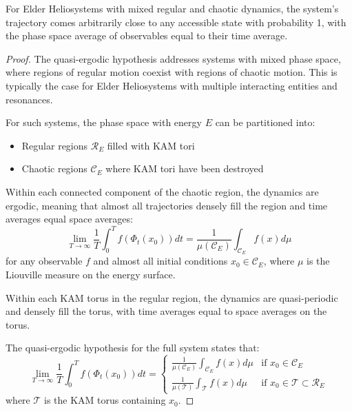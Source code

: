 \begin{theorem}
For Elder Heliosystems with mixed regular and chaotic dynamics, the system's trajectory comes arbitrarily close to any accessible state with probability 1, with the phase space average of observables equal to their time average.
\end{theorem}

\begin{proof}
The quasi-ergodic hypothesis addresses systems with mixed phase space, where regions of regular motion coexist with regions of chaotic motion. This is typically the case for Elder Heliosystems with multiple interacting entities and resonances.

For such systems, the phase space with energy $E$ can be partitioned into:
\begin{itemize}
    \item Regular regions $\mathcal{R}_E$ filled with KAM tori
    \item Chaotic regions $\mathcal{C}_E$ where KAM tori have been destroyed
\end{itemize}

Within each connected component of the chaotic region, the dynamics are ergodic, meaning that almost all trajectories densely fill the region and time averages equal space averages:
\begin{equation}
\lim_{T \to \infty} \frac{1}{T} \int_0^T f(\Phi_t(x_0)) dt = \frac{1}{\mu(\mathcal{C}_E)} \int_{\mathcal{C}_E} f(x) d\mu
\end{equation}
for any observable $f$ and almost all initial conditions $x_0 \in \mathcal{C}_E$, where $\mu$ is the Liouville measure on the energy surface.

Within each KAM torus in the regular region, the dynamics are quasi-periodic and densely fill the torus, with time averages equal to space averages on the torus.

The quasi-ergodic hypothesis for the full system states that:
\begin{equation}
\lim_{T \to \infty} \frac{1}{T} \int_0^T f(\Phi_t(x_0)) dt = \begin{cases}
\frac{1}{\mu(\mathcal{C}_E)} \int_{\mathcal{C}_E} f(x) d\mu & \text{if } x_0 \in \mathcal{C}_E \\
\frac{1}{\mu(\mathcal{T})} \int_{\mathcal{T}} f(x) d\mu & \text{if } x_0 \in \mathcal{T} \subset \mathcal{R}_E
\end{cases}
\end{equation}
where $\mathcal{T}$ is the KAM torus containing $x_0$.


\end{proof}
